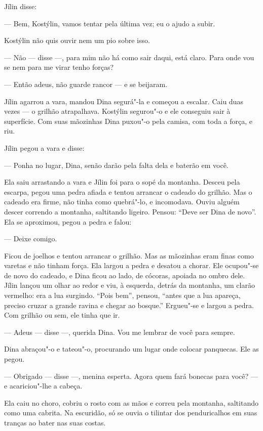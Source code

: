 Jílin disse:

--- Bem, Kostýlin, vamos tentar pela última vez; eu o ajudo a subir.

Kostýlin não quis ouvir nem um pio sobre isso.

--- Não --- disse ---, para mim não há como sair daqui, está claro. Para
onde vou se nem para me virar tenho forças?

--- Então adeus, não guarde rancor --- e se beijaram.

Jílin agarrou a vara, mandou Dina segurá"-la e começou a escalar. Caiu
duas vezes --- o grilhão atrapalhava. Kostýlin segurou"-o e ele conseguiu
sair à superfície. Com suas mãozinhas Dina puxou"-o pela camisa, com toda
a força, e riu.

Jílin pegou a vara e disse:

--- Ponha no lugar, Dina, senão darão pela falta dela e baterão em você.

Ela saiu arrastando a vara e Jílin foi para o sopé da montanha. Desceu
pela escarpa, pegou uma pedra afiada e tentou arrancar o cadeado do
grilhão. Mas o cadeado era firme, não tinha como quebrá"-lo, e
incomodava. Ouviu alguém descer correndo a montanha, saltitando ligeiro.
Pensou: ``Deve ser Dina de novo''. Ela se aproximou, pegou a pedra e
falou:

--- Deixe comigo.

Ficou de joelhos e tentou arrancar o grilhão. Mas as mãozinhas eram
finas como varetas e não tinham força. Ela largou a pedra e desatou a
chorar. Ele ocupou"-se de novo do cadeado, e Dina ficou ao lado, de
cócoras, apoiada no ombro dele. Jílin lançou um olhar ao redor e viu, à
esquerda, detrás da montanha, um clarão vermelho: era a lua surgindo.
``Pois bem'', pensou, ``antes que a lua apareça, preciso cruzar a grande
ravina e chegar ao bosque.'' Ergueu"-se e largou a pedra. Com grilhão ou
sem, ele tinha que ir.

--- Adeus --- disse ---, querida Dina. Vou me lembrar de você para
sempre.

Dina abraçou"-o e tateou"-o, procurando um lugar onde colocar panquecas.
Ele as pegou.

--- Obrigado --- disse ---, menina esperta. Agora quem fará bonecas para
você? --- e acariciou"-lhe a cabeça.

Ela caiu no choro, cobriu o rosto com as mãos e correu pela montanha,
saltitando como uma cabrita. Na escuridão, só se ouvia o tilintar dos
penduricalhos em suas tranças ao bater nas suas costas.

